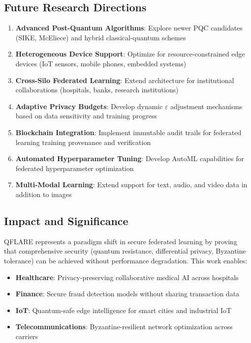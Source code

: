 \documentclass[12pt,a4paper]{article}
\begin{document}
\subsection{Future Research Directions}

\begin{enumerate}
    \item \textbf{Advanced Post-Quantum Algorithms}: Explore newer PQC candidates (SIKE, McEliece) and hybrid classical-quantum schemes
    \item \textbf{Heterogeneous Device Support}: Optimize for resource-constrained edge devices (IoT sensors, mobile phones, embedded systems)
    \item \textbf{Cross-Silo Federated Learning}: Extend architecture for institutional collaborations (hospitals, banks, research institutions)
    \item \textbf{Adaptive Privacy Budgets}: Develop dynamic $\varepsilon$ adjustment mechanisms based on data sensitivity and training progress
    \item \textbf{Blockchain Integration}: Implement immutable audit trails for federated learning training provenance and verification
    \item \textbf{Automated Hyperparameter Tuning}: Develop AutoML capabilities for federated hyperparameter optimization
    \item \textbf{Multi-Modal Learning}: Extend support for text, audio, and video data in addition to images
\end{enumerate}

\subsection{Impact and Significance}

QFLARE represents a paradigm shift in secure federated learning by proving that comprehensive security (quantum resistance, differential privacy, Byzantine tolerance) can be achieved without performance degradation. This work enables:

\begin{itemize}
    \item \textbf{Healthcare}: Privacy-preserving collaborative medical AI across hospitals
    \item \textbf{Finance}: Secure fraud detection models without sharing transaction data
    \item \textbf{IoT}: Quantum-safe edge intelligence for smart cities and industrial IoT
    \item \textbf{Telecommunications}: Byzantine-resilient network optimization across carriers
\end{itemize}
\end{document}
